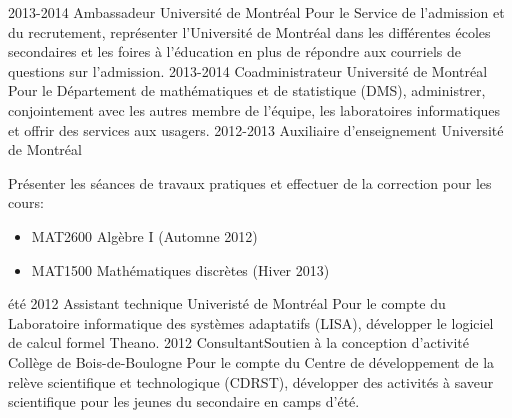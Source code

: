 \documentclass{cv-friggeri}  %
\begin{document}
\begin{entrylist}
\entryetc
{2013-2014}  %
{Ambassadeur}{}
{Université de Montréal}
{Pour le Service de l'admission et du recrutement, représenter l'Université de Montréal dans les différentes écoles secondaires et les foires à l'éducation en plus de répondre aux courriels de questions sur l'admission.}
\entryetc
{2013-2014}  %
{Coadministrateur}{}
{Université de Montréal}
{Pour le Département de mathématiques et de statistique (DMS), administrer, conjointement avec les autres membre de l'équipe, les laboratoires informatiques et offrir des services aux usagers.
}
\entryetc
{2012-2013}
{Auxiliaire d'enseignement}{}
{Université de Montréal}
{Présenter les séances de travaux pratiques et effectuer de la correction pour les cours:
\begin{itemize}
  \item MAT2600 Algèbre I (Automne 2012)
  \item MAT1500 Mathématiques discrètes (Hiver 2013)
\end{itemize}
}
\entryetc
{été 2012}
{Assistant technique}{}
{Univeristé de Montréal}
{Pour le compte du Laboratoire informatique des systèmes adaptatifs (LISA), développer le logiciel de calcul formel Theano.
}
\entryetc
{2012}
{Consultant}{Soutien à la conception d’activité}
{Collège de Bois-de-Boulogne}
{Pour le compte du Centre de développement de la relève scientifique et technologique (CDRST), développer des activités à saveur scientifique pour les jeunes du secondaire en camps d'été.
}

\end{entrylist}
\end{document}
